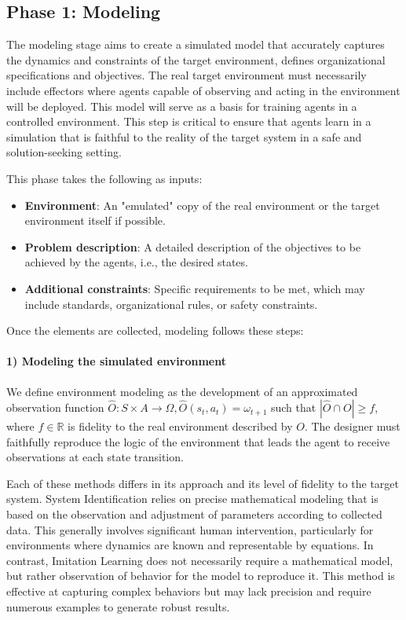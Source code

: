 \documentclass[sigconf,anonymous]{aamas}
\begin{document}
\subsection{Phase 1: Modeling}

The modeling stage aims to create a simulated model that accurately captures the dynamics and constraints of the target environment, defines organizational specifications and objectives. The real target environment must necessarily include effectors where agents capable of observing and acting in the environment will be deployed. This model will serve as a basis for training agents in a controlled environment. This step is critical to ensure that agents learn in a simulation that is faithful to the reality of the target system in a safe and solution-seeking setting.

This phase takes the following as inputs:
\begin{itemize}
    \item \textbf{Environment}: An "emulated" copy of the real environment or the target environment itself if possible.
    \item \textbf{Problem description}: A detailed description of the objectives to be achieved by the agents, i.e., the desired states.
    \item \textbf{Additional constraints}: Specific requirements to be met, which may include standards, organizational rules, or safety constraints.
\end{itemize}

Once the elements are collected, modeling follows these steps: 


\paragraph{\textbf{1) Modeling the simulated environment}} \quad

\noindent We define environment modeling as the development of an approximated observation function $\hat{O}: S \times A \to \Omega, \hat{O}(s_t,a_t) = \omega_{t+1}$ such that $|\hat{O} \cap O| \geq f$, where $f \in \mathbb{R}$ is fidelity to the real environment described by $O$.
The designer must faithfully reproduce the logic of the environment that leads the agent to receive observations at each state transition. 

Each of these methods differs in its approach and its level of fidelity to the target system. System Identification relies on precise mathematical modeling that is based on the observation and adjustment of parameters according to collected data. This generally involves significant human intervention, particularly for environments where dynamics are known and representable by equations. In contrast, Imitation Learning does not necessarily require a mathematical model, but rather observation of behavior for the model to reproduce it. This method is effective at capturing complex behaviors but may lack precision and require numerous examples to generate robust results.
\end{document}
